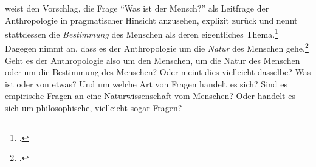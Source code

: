   weist den Vorschlag, die Frage \enquote{Was ist der Mensch?} als Leitfrage der
  Anthropologie in pragmatischer Hinsicht anzusehen, explizit zurück und nennt
  stattdessen die \emph{Bestimmung} des Menschen als deren eigentliches
  Thema.\footcite[Vgl.][86-7]{Brandt:TheGuidingIdeaofKantsAnthropologyandtheVocationoftheHumanBeing2003}
  Dagegen nimmt  an,
  dass es der Anthropologie um die
\emph{Natur} des Menschen
gehe.\footcite[Vgl.][passim]{Wood:KantandtheProblemofHumanNature2003} Geht es
der Anthropologie also um den Menschen, um die Natur des Menschen oder um die
Bestimmung des Menschen? Oder meint dies vielleicht dasselbe? Was ist
 oder  von etwas? Und um welche Art
von Fragen handelt es sich? Sind es empirische Fragen an eine Naturwissenschaft
vom Menschen? Oder handelt es sich um philosophische, vielleicht sogar
 Fragen?

